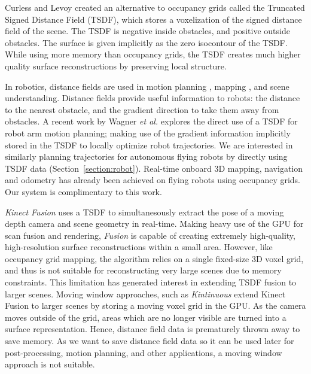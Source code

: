 \documentclass[conference]{IEEEtran}
\newcommand{\sref}[1]{Section~\ref{#1}}
\newcommand{\etal}{\textit{et al.}\xspace}
\newcommand{\TSDF}{TSDF\xspace}
\begin{document}

Curless and Levoy \cite{Curless1996} created an alternative to occupancy
grids called the Truncated Signed Distance Field (\TSDF), which stores a
voxelization of the signed distance field of the scene. The \TSDF is negative
inside obstacles, and positive outside obstacles. The surface is given
implicitly as the zero isocontour of the \TSDF. While using more memory
than occupancy grids, the \TSDF creates much higher quality surface
reconstructions by preserving local structure.

In robotics, distance fields are used in motion planning
\cite{RatliffChomp}, mapping \cite{VandapelKA05}, and scene understanding.
Distance fields provide useful information to robots: the distance to the
nearest obstacle, and the gradient direction to take them away from obstacles. 
A recent work by Wagner \etal \cite{WagnerICRA13} explores the direct use of a
\TSDF for robot arm motion planning; making use of the gradient information
implicitly stored in the \TSDF to locally optimize robot trajectories. We are
interested in similarly planning trajectories for autonomous flying robots by
directly using \TSDF data (\sref{section:robot}). Real-time onboard 3D mapping,
navigation and odometry has already been achieved on flying robots
\cite{FlyingNavigation, OSMAV}using occupancy grids. Our system is
complimentary to this work.

\emph{Kinect Fusion} \cite{Newcombe} uses a \TSDF to simultanesously extract the
pose of a moving depth camera and scene geometry in real-time. Making
heavy use of the GPU for scan fusion and rendering, \textit{Fusion} is capable
of creating extremely high-quality, high-resolution surface reconstructions within
a small area. However, like occupancy grid mapping, the algorithm relies on a
single fixed-size 3D voxel grid, and thus is not suitable for reconstructing
very large scenes due to memory constraints. This limitation has generated
interest in extending  \TSDF fusion to larger scenes. 
Moving window approaches, such as \emph{Kintinuous} \cite{Whelan2013} extend
Kinect Fusion to larger scenes by storing  a moving voxel grid in the GPU. As
the camera moves outside of the grid, areas which are no longer visible are
turned into a surface representation. Hence, distance field data is prematurely 
thrown away to save memory. As we want to save distance field data so it can be
used later for post-processing, motion planning, and other applications, a
moving window approach is not suitable.
\end{document}
